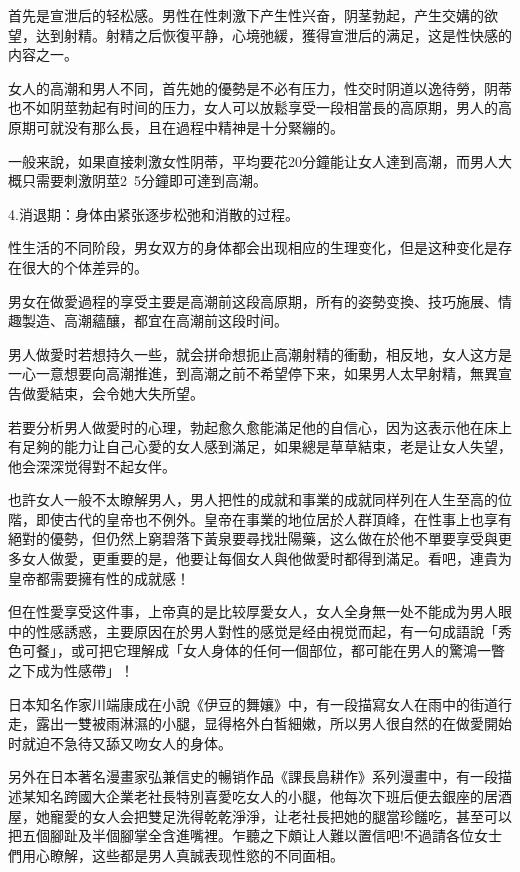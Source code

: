\documentclass[12pt,UTF8]{ctexbook}
\begin{document}
首先是宣泄后的轻松感。男性在性刺激下产生性兴奋，阴茎勃起，产生交媾的欲望，达到射精。射精之后恢復平静，心境弛緩，獲得宣泄后的满足，这是性快感的内容之一。

女人的高潮和男人不同，首先她的優勢是不必有压力，性交时阴道以逸待勞，阴蒂也不如阴莖勃起有时间的压力，女人可以放鬆享受一段相當長的高原期，男人的高原期可就没有那么長，且在過程中精神是十分緊繃的。

一般来說，如果直接刺激女性阴蒂，平均要花20分鐘能让女人達到高潮，而男人大概只需要刺激阴莖2~5分鐘即可達到高潮。

4.消退期：身体由紧张逐步松弛和消散的过程。

性生活的不同阶段，男女双方的身体都会出现相应的生理变化，但是这种变化是存在很大的个体差异的。

男女在做愛過程的享受主要是高潮前这段高原期，所有的姿勢变換、技巧施展、情趣製造、高潮蘊釀，都宜在高潮前这段时间。

男人做愛时若想持久一些，就会拼命想扼止高潮射精的衝動，相反地，女人这方是一心一意想要向高潮推進，到高潮之前不希望停下来，如果男人太早射精，無異宣告做愛結束，会令她大失所望。

若要分析男人做愛时的心理，勃起愈久愈能滿足他的自信心，因为这表示他在床上有足夠的能力让自己心愛的女人感到滿足，如果總是草草結束，老是让女人失望，他会深深觉得對不起女伴。

也許女人一般不太瞭解男人，男人把性的成就和事業的成就同样列在人生至高的位階，即使古代的皇帝也不例外。皇帝在事業的地位居於人群頂峰，在性事上也享有絕對的優勢，但仍然上窮碧落下黃泉要尋找壯陽藥，这么做在於他不單要享受與更多女人做愛，更重要的是，他要让每個女人與他做愛时都得到滿足。看吧，連貴为皇帝都需要擁有性的成就感！

但在性愛享受这件事，上帝真的是比较厚愛女人，女人全身無一处不能成为男人眼中的性感誘惑，主要原因在於男人對性的感觉是经由視觉而起，有一句成語說「秀色可餐」，或可把它理解成「女人身体的任何一個部位，都可能在男人的驚鴻一瞥之下成为性感帶」！

日本知名作家川端康成在小說《伊豆的舞孃》中，有一段描寫女人在雨中的街道行走，露出一雙被雨淋濕的小腿，显得格外白皙細嫩，所以男人很自然的在做愛開始时就迫不急待又舔又吻女人的身体。

另外在日本著名漫畫家弘兼信史的暢销作品《課長島耕作》系列漫畫中，有一段描述某知名跨國大企業老社長特別喜愛吃女人的小腿，他每次下班后便去銀座的居酒屋，她寵愛的女人会把雙足洗得乾乾淨淨，让老社長把她的腿當珍饈吃，甚至可以把五個腳趾及半個腳掌全含進嘴裡。乍聽之下頗让人難以置信吧!不過請各位女士們用心瞭解，这些都是男人真誠表现性慾的不同面相。
\end{document}
